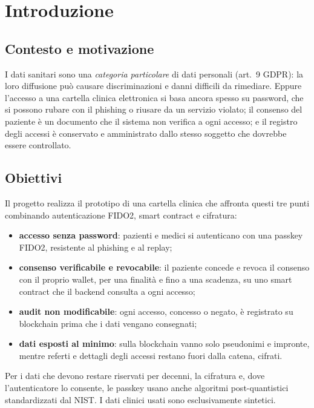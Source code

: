 \section{Introduzione}\label{sec:introduzione}

\subsection{Contesto e motivazione}
I dati sanitari sono una \emph{categoria particolare} di dati personali (art.~9 GDPR\cite{gdpr}): la loro diffusione può causare discriminazioni e danni difficili da rimediare. Eppure l'accesso a una cartella clinica elettronica si basa ancora spesso su password, che si possono rubare con il phishing o riusare da un servizio violato; il consenso del paziente è un documento che il sistema non verifica a ogni accesso; e il registro degli accessi è conservato e amministrato dallo stesso soggetto che dovrebbe essere controllato.

\subsection{Obiettivi}
Il progetto realizza il prototipo di una cartella clinica che affronta questi tre punti combinando autenticazione FIDO2, smart contract e cifratura:
\begin{itemize}
  \item \textbf{accesso senza password}: pazienti e medici si autenticano con una passkey FIDO2, resistente al phishing e al replay;
  \item \textbf{consenso verificabile e revocabile}: il paziente concede e revoca il consenso con il proprio wallet, per una finalità e fino a una scadenza, su uno smart contract che il backend consulta a ogni accesso;
  \item \textbf{audit non modificabile}: ogni accesso, concesso o negato, è registrato su blockchain prima che i dati vengano consegnati;
  \item \textbf{dati esposti al minimo}: sulla blockchain vanno solo pseudonimi e impronte, mentre referti e dettagli degli accessi restano fuori dalla catena, cifrati.
\end{itemize}
Per i dati che devono restare riservati per decenni, la cifratura e, dove l'autenticatore lo consente, le passkey usano anche algoritmi post-quantistici standardizzati dal NIST. I dati clinici usati sono esclusivamente sintetici.

